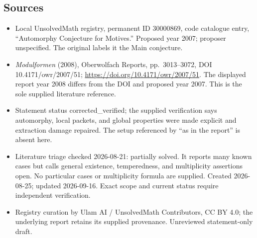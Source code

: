 \documentclass[11pt]{article}
\begin{document}
\subsection{Sources}
\begin{itemize}
\item Local UnsolvedMath registry, permanent ID 30000869, code catalogue entry, ``Automorphy Conjecture for Motives.'' Proposed year 2007; proposer unspecified. The original labels it the Main conjecture.
\item \emph{Modulformen} (2008), Oberwolfach Reports, pp.\ 3013--3072, DOI 10.4171/owr/2007/51; \url{https://doi.org/10.4171/owr/2007/51}. The displayed report year 2008 differs from the DOI and proposed year 2007. This is the sole supplied literature reference.
\item Statement status corrected\_verified; the supplied verification says automorphy, local packets, and global properties were made explicit and extraction damage repaired. The setup referenced by ``as in the report'' is absent here.
\item Literature triage checked 2026-08-21: partially solved. It reports many known cases but calls general existence, temperedness, and multiplicity assertions open. No particular cases or multiplicity formula are supplied. Created 2026-08-25; updated 2026-09-16. Exact scope and current status require independent verification.
\item Registry curation by Ulam AI / UnsolvedMath Contributors, CC BY 4.0; the underlying report retains its supplied provenance. Unreviewed statement-only draft.
\end{itemize}
\end{document}
